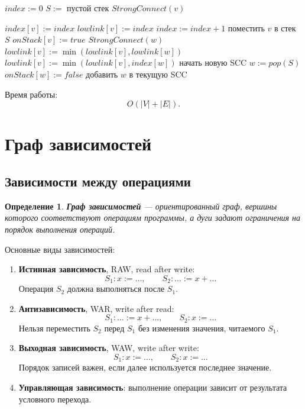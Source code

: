 \documentclass[12pt,a4paper]{article}
\newtheorem{definition}{Определение}
\begin{document}
\begin{algorithm}[H]
\caption{Алгоритм Тарьяна}
\begin{algorithmic}[1]
\State $index := 0$
\State $S :=$ пустой стек
        \State $StrongConnect(v)$
    \EndIf
\EndFor

    \State $index[v] := index$
    \State $lowlink[v] := index$
    \State $index := index+1$
    \State поместить $v$ в стек $S$
    \State $onStack[v] := true$
            \State $StrongConnect(w)$
            \State $lowlink[v] := \min(lowlink[v], lowlink[w])$
            \State $lowlink[v] := \min(lowlink[v], index[w])$
        \EndIf
    \EndFor
        \State начать новую SCC
        \Repeat
            \State $w := pop(S)$
            \State $onStack[w] := false$
            \State добавить $w$ в текущую SCC
    \EndIf
\EndProcedure
\end{algorithmic}
\end{algorithm}

Время работы:
\[
O(|V|+|E|).
\]

\section{Граф зависимостей}

\subsection{Зависимости между операциями}

\begin{definition}
\textbf{Граф зависимостей} --- ориентированный граф, вершины которого соответствуют операциям программы, а дуги задают ограничения на порядок выполнения операций.
\end{definition}

Основные виды зависимостей:

\begin{enumerate}
    \item \textbf{Истинная зависимость}, RAW, read after write:
    \[
    S_1: x:=\ldots,
    \qquad
    S_2: \ldots:=x+\ldots
    \]
    Операция $S_2$ должна выполняться после $S_1$.

    \item \textbf{Антизависимость}, WAR, write after read:
    \[
    S_1: \ldots:=x+\ldots,
    \qquad
    S_2: x:=\ldots
    \]
    Нельзя переместить $S_2$ перед $S_1$ без изменения значения, читаемого $S_1$.

    \item \textbf{Выходная зависимость}, WAW, write after write:
    \[
    S_1: x:=\ldots,
    \qquad
    S_2: x:=\ldots
    \]
    Порядок записей важен, если далее используется последнее значение.

    \item \textbf{Управляющая зависимость}:
    выполнение операции зависит от результата условного перехода.
\end{enumerate}
\end{document}

